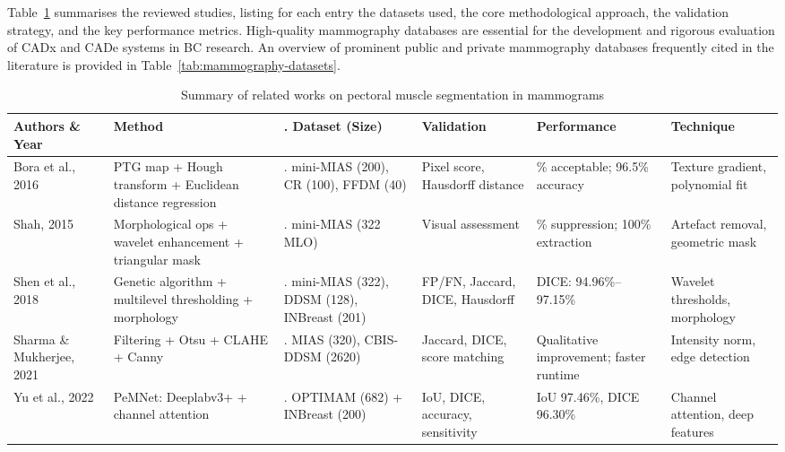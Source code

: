 \documentclass[runningheads]{llncs}
\begin{document}
Table~\ref{tab:relatedworks} summarises the reviewed studies, listing
for each entry the datasets used, the core methodological approach,
the validation strategy, and the key performance metrics. High-quality
mammography databases are essential for the development and rigorous
evaluation of \ac{CADx} and \ac{CADe} systems in \ac{BC} research. An
overview of prominent public and private mammography databases
frequently cited in the literature is provided in
Table~\ref{tab:mammography-datasets}.

\begin{table}[htbp]
\centering
\caption{Summary of related works on pectoral muscle segmentation in mammograms}
\label{tab:relatedworks}
\scriptsize
\begin{tabularx}{\textwidth}{|>{\hsize=0.6\hsize}X|>{\hsize=1.2\hsize}X|>{\hsize=1.\hsize}X|>{\hsize=1.0\hsize}X|>{\hsize=1.1\hsize}X|>{\hsize=1.1\hsize}X|}
\hline
\textbf{Authors \& Year} & \textbf{Method} & \textbf{Dataset (Size)} & \textbf{Validation} & \textbf{Performance} & \textbf{Technique} \\ \hline

Bora et al., 2016 \cite{Bora2016} & PTG map + Hough transform + Euclidean distance regression & mini-MIAS (200), CR (100), FFDM (40) & Pixel score, Hausdorff distance & 96.75\% acceptable; 96.5\% accuracy & Texture gradient, polynomial fit \\ \hline

Shah, 2015 \cite{Shah2015} & Morphological ops + wavelet enhancement + triangular mask & mini-MIAS (322 MLO) & Visual assessment & 98\% suppression; 100\% extraction & Artefact removal, geometric mask \\ \hline

Shen et al., 2018 \cite{Shen2018} & Genetic algorithm + multilevel thresholding + morphology & mini-MIAS (322), DDSM (128), INBreast (201) & FP/FN, Jaccard, DICE, Hausdorff & DICE: 94.96\%–97.15\% & Wavelet thresholds, morphology \\ \hline

Sharma \& Mukherjee, 2021 \cite{Sharma2021} & Filtering + Otsu + CLAHE + Canny & MIAS (320), CBIS-DDSM (2620) & Jaccard, DICE, score matching & Qualitative improvement; faster runtime & Intensity norm, edge detection \\ \hline

Yu et al., 2022 \cite{Yu2022} & PeMNet: Deeplabv3+ + channel attention & OPTIMAM (682) + INBreast (200) & IoU, DICE, accuracy, sensitivity & IoU 97.46\%, DICE 96.30\% & Channel attention, deep features \\ \hline


\end{tabularx}
\end{table}
\end{document}
